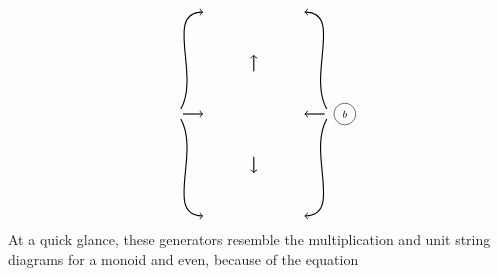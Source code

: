\documentclass[11pt]{amsart}
\theoremstyle{remark}
\theoremstyle{definition}
\begin{document}
\[{\begin{tikzpicture}[scale=0.95]
\begin{scope}
\node [style=circle,draw=black] at (2.4,1) {\scriptsize $b$};
\end{scope}
\node (v1) at (-2,1) {};
\node (v2) at (-1.2,1) {};
\draw [thick,->]  (v1) edge (v2);
\node (v3) at (2,1) {};
\node (v4) at (1.2,1) {};
\draw [thick,->] (v3) edge (v4);
\node (v14) at (0,2) {};
\node (v15) at (0,2.7) {};
\draw [thick,->] (v14) edge (v15);
\node (v16) at (0,0) {};
\node (v17) at (0,-0.7) {};
\draw [thick,->] (v16) edge (v17);
\node (v18) at (-1.2,3.7) {};
\node (v19) at (-1.2,-1.7) {};
\draw [thick,->] (v1) edge [in=180, out=60] (v18);
\draw [thick,->] (v1) edge [in=180, out=-60] (v19);
\node (v20) at (1.2,3.7) {};
\node (v21) at (1.2,-1.7) {};
\draw [thick,->](v3) edge [in=0, out=120] (v20);
\draw [thick,->] (v3) edge [in=0, out=-120] (v21);
\end{tikzpicture}
}
\] 
At a quick glance, 
these generators resemble 
the multiplication and 
unit string diagrams for a 
monoid and even, 
because of the equation
\end{document}
